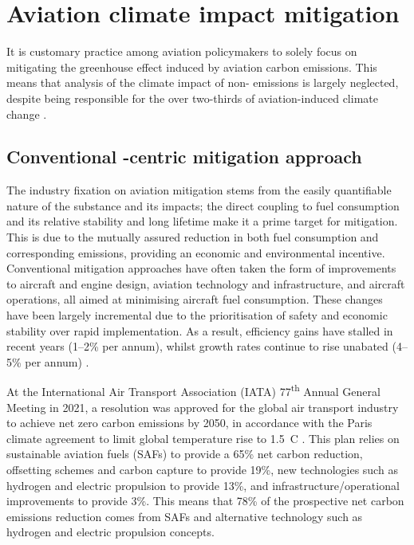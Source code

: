 \section{Aviation climate impact mitigation}
\label{Mitigation}
It is customary practice among aviation policymakers to solely focus on mitigating the greenhouse effect induced by aviation carbon emissions. This means that analysis of the climate impact of non- emissions is largely neglected, despite being responsible for the over two-thirds of aviation-induced climate change \cite{Lee2021}. 



\subsection{Conventional -centric mitigation approach}
The industry fixation on aviation  mitigation stems from the easily quantifiable nature of the substance and its impacts; the direct coupling to fuel consumption and its relative stability and long lifetime make it a prime target for mitigation. This is due to the mutually assured reduction in both fuel consumption and corresponding  emissions, providing an economic and environmental incentive. Conventional mitigation approaches have often taken the form of improvements to aircraft and engine design, aviation technology and infrastructure, and aircraft operations, all aimed at minimising aircraft fuel consumption. These changes have been largely incremental due to the prioritisation of safety and economic stability over rapid implementation. As a result, efficiency gains have stalled in recent years (1--2\% per annum), whilst growth rates continue to rise unabated (4--5\% per annum) \cite{Peeters2016, Lee2021}. 

\begin{figure}
\end{figure}

At the International Air Transport Association (IATA) 77\textsuperscript{th} Annual General Meeting in 2021, a resolution was approved for the global air transport industry to achieve net zero carbon emissions by 2050, in accordance with the Paris climate agreement to limit global temperature rise to 1.5~\textdegree C \cite{IATA2050}. This plan relies on sustainable aviation fuels (SAFs) to provide a 65\% net carbon reduction, offsetting schemes and carbon capture to provide 19\%, new technologies such as hydrogen and electric propulsion to provide 13\%, and infrastructure/operational improvements to provide 3\%. This means that 78\% of the prospective net carbon emissions reduction comes from SAFs and alternative technology such as hydrogen and electric propulsion concepts. 

